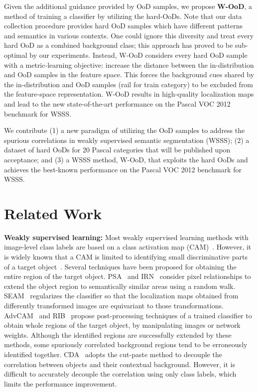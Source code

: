 \documentclass[10pt,twocolumn,letterpaper]{article}
\begin{document}
Given the additional guidance provided by OoD samples, we propose \textbf{W-OoD}, a method of training a classifier by utilizing the hard-OoDs. 
Note that our data collection procedure provides hard OoD samples which have different patterns and semantics in various contexts.
One could ignore this diversity and treat every hard OoD as a combined background class; this approach has proved to be sub-optimal by our experiments.
Instead, W-OoD considers every hard OoD sample with a metric-learning objective: increase the distance between the in-distribution and OoD samples in the feature space.
This forces the background cues shared by the in-distribution and OoD samples (\eg rail for train category) to be excluded from the feature-space representation. 
W-OoD results in high-quality localization maps and lead to the new state-of-the-art performance on the Pascal VOC 2012 benchmark for WSSS.












We contribute (1) a new paradigm of utilizing the OoD samples to address the spurious correlations in weakly supervised semantic segmentation (WSSS); (2) a dataset of hard OoDs for 20 Pascal categories that will be published upon acceptance; and (3) a WSSS method, W-OoD, that exploits the hard OoDs and achieves the best-known performance on the Pascal VOC 2012 benchmark for WSSS.



\section{Related Work}

\textbf{Weakly supervised learning:}
Most weakly supervised learning methods with image-level class labels are based on a class activation map (CAM)~\cite{zhou2016learning}. However, it is widely
known that a CAM is limited to identifying small discriminative parts of a target object~\cite{lee2019ficklenet, ahn2019weakly, lee2021reducing}.
Several techniques have been proposed for obtaining the entire region of the target object.
PSA~\cite{ahn2018learning} and IRN~\cite{ahn2019weakly} consider pixel relationships to extend the object region to semantically similar areas using a random walk.
SEAM~\cite{wang2020self} regularizes the classifier so that the localization maps obtained from differently transformed images are equivariant to those transformations.
AdvCAM~\cite{lee2021anti} and RIB~\cite{lee2021reducing} propose post-processing techniques of a trained classifier to obtain whole regions of the target object, by manipulating images or network weights.
Although the identified regions are successfully extended by these methods, some spuriously correlated background regions tend to be erroneously identified together. 
CDA~\cite{su2021context} adopts the cut-paste method to decouple the correlation between objects and their contextual background.
However, it is difficult to accurately decouple the correlation using only class labels, which limits the performance improvement. 
\end{document}
